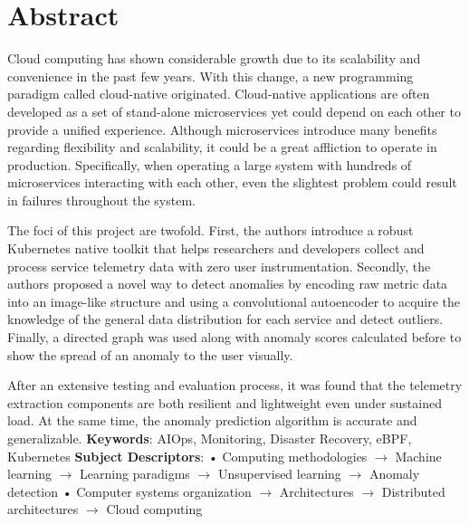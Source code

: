 \chapter*{Abstract}

Cloud computing has shown considerable growth due to its scalability and convenience in the past few years. With this change, a new programming paradigm called cloud-native originated. Cloud-native applications are often developed as a set of stand-alone microservices yet could depend on each other to provide a unified experience. Although microservices introduce many benefits regarding flexibility and scalability, it could be a great affliction to operate in production. Specifically, when operating a large system with hundreds of microservices interacting with each other, even the slightest problem could result in failures throughout the system.

The foci of this project are twofold. First, the authors introduce a robust Kubernetes native toolkit that helps researchers and developers collect and process service telemetry data with zero user instrumentation. Secondly, the authors proposed a novel way to detect anomalies by encoding raw metric data into an image-like structure and using a convolutional autoencoder to acquire the knowledge of the general data distribution for each service and detect outliers. Finally, a directed graph was used along with anomaly scores calculated before to show the spread of an anomaly to the user visually. 

After an extensive testing and evaluation process, it was found that the telemetry extraction components are both resilient and lightweight even under sustained load. At the same time, the anomaly prediction algorithm is accurate and generalizable.
\newline
\newline
\textbf{Keywords}:
AIOps, Monitoring, Disaster Recovery, eBPF, Kubernetes
\newline
\textbf{Subject Descriptors}:
• Computing methodologies $\rightarrow$ Machine learning $\rightarrow$ Learning paradigms $\rightarrow$ Unsupervised learning $\rightarrow$ Anomaly detection • Computer systems organization $\rightarrow$ Architectures $\rightarrow$ Distributed architectures $\rightarrow$ Cloud computing